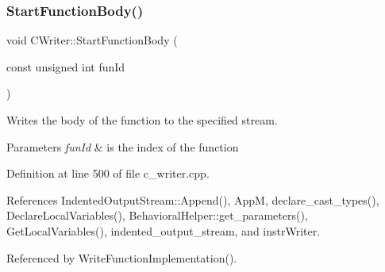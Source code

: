 \subsubsection{\texorpdfstring{Start\+Function\+Body()}{StartFunctionBody()}}
{\footnotesize\ttfamily void C\+Writer\+::\+Start\+Function\+Body (\begin{DoxyParamCaption}\item[{const unsigned int}]{fun\+Id }\end{DoxyParamCaption})\hspace{0.3cm}{\ttfamily [virtual]}}



Writes the body of the function to the specified stream. 


\begin{DoxyParams}{Parameters}
{\em fun\+Id} & is the index of the function \\
\hline
\end{DoxyParams}


Definition at line 500 of file c\+\_\+writer.\+cpp.



References Indented\+Output\+Stream\+::\+Append(), AppM, declare\+\_\+cast\+\_\+types(), Declare\+Local\+Variables(), Behavioral\+Helper\+::get\+\_\+parameters(), Get\+Local\+Variables(), indented\+\_\+output\+\_\+stream, and instr\+Writer.



Referenced by Write\+Function\+Implementation().

